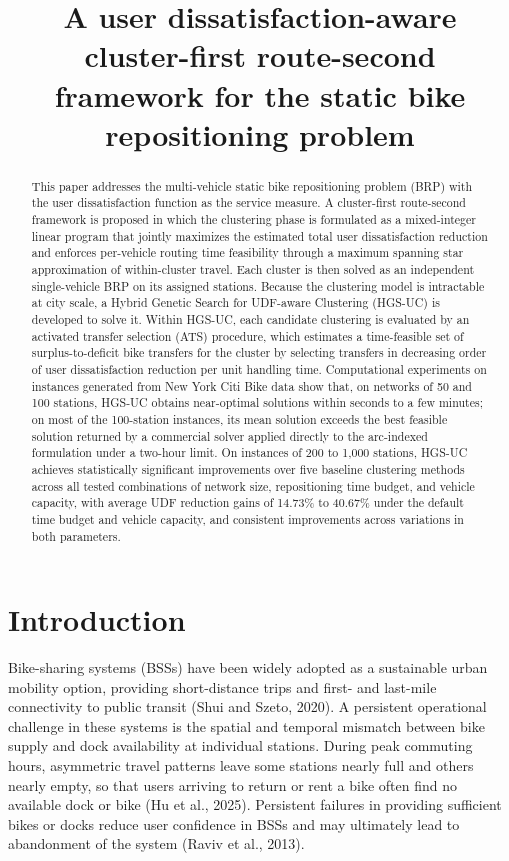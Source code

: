 \documentclass[11pt]{article}
\title{A user dissatisfaction-aware cluster-first route-second framework for the static bike repositioning problem}
\author{}
\date{}
\numberwithin{table}{section}
\numberwithin{figure}{section}
\begin{document}
\maketitle

\begin{abstract}
This paper addresses the multi-vehicle static bike repositioning problem (BRP) with the user dissatisfaction function as the service measure. A cluster-first route-second framework is proposed in which the clustering phase is formulated as a mixed-integer linear program that jointly maximizes the estimated total user dissatisfaction reduction and enforces per-vehicle routing time feasibility through a maximum spanning star approximation of within-cluster travel. Each cluster is then solved as an independent single-vehicle BRP on its assigned stations. Because the clustering model is intractable at city scale, a Hybrid Genetic Search for UDF-aware Clustering (HGS-UC) is developed to solve it. Within HGS-UC, each candidate clustering is evaluated by an activated transfer selection (ATS) procedure, which estimates a time-feasible set of surplus-to-deficit bike transfers for the cluster by selecting transfers in decreasing order of user dissatisfaction reduction per unit handling time. Computational experiments on instances generated from New York Citi Bike data show that, on networks of 50 and 100 stations, HGS-UC obtains near-optimal solutions within seconds to a few minutes; on most of the 100-station instances, its mean solution exceeds the best feasible solution returned by a commercial solver applied directly to the arc-indexed formulation under a two-hour limit. On instances of 200 to 1,000 stations, HGS-UC achieves statistically significant improvements over five baseline clustering methods across all tested combinations of network size, repositioning time budget, and vehicle capacity, with average UDF reduction gains of 14.73\% to 40.67\% under the default time budget and vehicle capacity, and consistent improvements across variations in both parameters.
\end{abstract}

\section{Introduction}

Bike-sharing systems (BSSs) have been widely adopted as a sustainable urban mobility option, providing short-distance trips and first- and last-mile connectivity to public transit (Shui and Szeto, 2020). A persistent operational challenge in these systems is the spatial and temporal mismatch between bike supply and dock availability at individual stations. During peak commuting hours, asymmetric travel patterns leave some stations nearly full and others nearly empty, so that users arriving to return or rent a bike often find no available dock or bike (Hu et al., 2025). Persistent failures in providing sufficient bikes or docks reduce user confidence in BSSs and may ultimately lead to abandonment of the system (Raviv et al., 2013).
\end{document}

